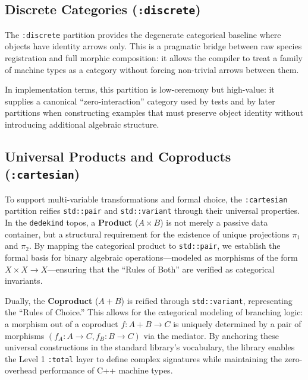 \documentclass[11pt, a4paper]{report}
\begin{document}
\subsection{Discrete Categories (\texttt{:discrete})}

The \texttt{:discrete} partition provides the degenerate categorical baseline where objects have identity arrows only. This is a pragmatic bridge between raw species registration and full morphic composition: it allows the compiler to treat a family of machine types as a category without forcing non-trivial arrows between them.

In implementation terms, this partition is low-ceremony but high-value: it supplies a canonical ``zero-interaction'' category used by tests and by later partitions when constructing examples that must preserve object identity without introducing additional algebraic structure.


\subsection{Universal Products and Coproducts (\texttt{:cartesian})}

To support multi-variable transformations and formal choice, the \texttt{:cartesian} partition reifies \texttt{std::pair} and \texttt{std::variant} through their universal properties. In the \texttt{dedekind} topos, a \textbf{Product} ($A \times B$) is not merely a passive data container, but a structural requirement for the existence of unique projections $\pi_1$ and $\pi_2$. By mapping the categorical product to \texttt{std::pair}, we establish the formal basis for binary algebraic operations—modeled as morphisms of the form $X \times X \to X$—ensuring that the ``Rules of Both'' are verified as categorical invariants.

Dually, the \textbf{Coproduct} ($A + B$) is reified through \texttt{std::variant}, representing the ``Rules of Choice.'' This allows for the categorical modeling of branching logic: a morphism out of a coproduct $f: A + B \to C$ is uniquely determined by a pair of morphisms $(f_A: A \to C, f_B: B \to C)$ via the mediator. By anchoring these universal constructions in the standard library's vocabulary, the library enables the Level 1 \texttt{:total} layer to define complex signatures while maintaining the zero-overhead performance of C++ machine types.
\end{document}
